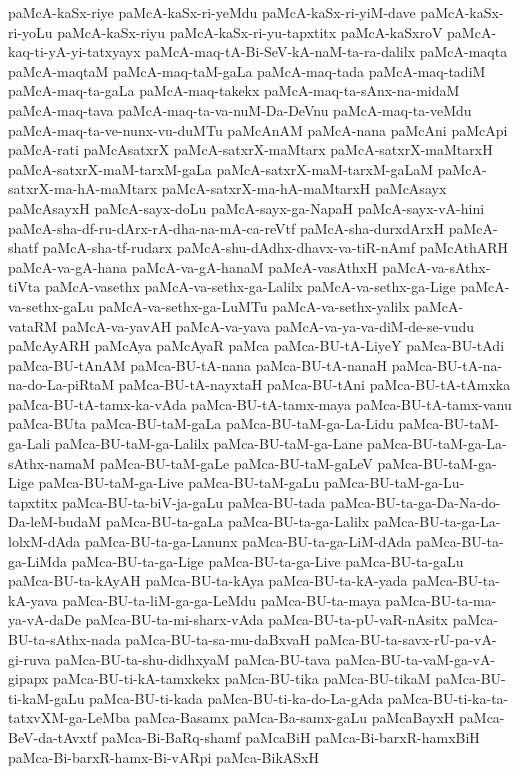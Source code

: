 {paMcA-kaSx-riye
paMcA-kaSx-ri-yeMdu
paMcA-kaSx-ri-yiM-dave
paMcA-kaSx-ri-yoLu
paMcA-kaSx-riyu
paMcA-kaSx-ri-yu-tapxtitx
paMcA-kaSxroV
paMcA-kaq-ti-yA-yi-tatxyayx
paMcA-maq-tA-Bi-SeV-kA-naM-ta-ra-dalilx
paMcA-maqta
paMcA-maqtaM
paMcA-maq-taM-gaLa
paMcA-maq-tada
paMcA-maq-tadiM
paMcA-maq-ta-gaLa
paMcA-maq-takekx
paMcA-maq-ta-sAnx-na-midaM
paMcA-maq-tava
paMcA-maq-ta-va-nuM-Da-DeVnu
paMcA-maq-ta-veMdu
paMcA-maq-ta-ve-nunx-vu-duMTu
paMcAnAM
paMcA-nana
paMcAni
paMcApi
paMcA-rati
paMcAsatxrX
paMcA-satxrX-maMtarx
paMcA-satxrX-maMtarxH
paMcA-satxrX-maM-tarxM-gaLa
paMcA-satxrX-maM-tarxM-gaLaM
paMcA-satxrX-ma-hA-maMtarx
paMcA-satxrX-ma-hA-maMtarxH
paMcAsayx
paMcAsayxH
paMcA-sayx-doLu
paMcA-sayx-ga-NapaH
paMcA-sayx-vA-hini
paMcA-sha-df-ru-dArx-rA-dha-na-mA-ca-reVtf
paMcA-sha-durxdArxH
paMcA-shatf
paMcA-sha-tf-rudarx
paMcA-shu-dAdhx-dhavx-va-tiR-nAmf
paMcAthARH
paMcA-va-gA-hana
paMcA-va-gA-hanaM
paMcA-vasAthxH
paMcA-va-sAthx-tiVta
paMcA-vasethx
paMcA-va-sethx-ga-Lalilx
paMcA-va-sethx-ga-Lige
paMcA-va-sethx-gaLu
paMcA-va-sethx-ga-LuMTu
paMcA-va-sethx-yalilx
paMcA-vataRM
paMcA-va-yavAH
paMcA-va-yava
paMcA-va-ya-va-diM-de-se-vudu
paMcAyARH
paMcAya
paMcAyaR
paMca
paMca-BU-tA-LiyeY
paMca-BU-tAdi
paMca-BU-tAnAM
paMca-BU-tA-nana
paMca-BU-tA-nanaH
paMca-BU-tA-na-na-do-La-piRtaM
paMca-BU-tA-nayxtaH
paMca-BU-tAni
paMca-BU-tA-tAmxka
paMca-BU-tA-tamx-ka-vAda
paMca-BU-tA-tamx-maya
paMca-BU-tA-tamx-vanu
paMca-BUta
paMca-BU-taM-gaLa
paMca-BU-taM-ga-La-Lidu
paMca-BU-taM-ga-Lali
paMca-BU-taM-ga-Lalilx
paMca-BU-taM-ga-Lane
paMca-BU-taM-ga-La-sAthx-namaM
paMca-BU-taM-gaLe
paMca-BU-taM-gaLeV
paMca-BU-taM-ga-Lige
paMca-BU-taM-ga-Live
paMca-BU-taM-gaLu
paMca-BU-taM-ga-Lu-tapxtitx
paMca-BU-ta-biV-ja-gaLu
paMca-BU-tada
paMca-BU-ta-ga-Da-Na-do-Da-leM-budaM
paMca-BU-ta-gaLa
paMca-BU-ta-ga-Lalilx
paMca-BU-ta-ga-La-lolxM-dAda
paMca-BU-ta-ga-Lanunx
paMca-BU-ta-ga-LiM-dAda
paMca-BU-ta-ga-LiMda
paMca-BU-ta-ga-Lige
paMca-BU-ta-ga-Live
paMca-BU-ta-gaLu
paMca-BU-ta-kAyAH
paMca-BU-ta-kAya
paMca-BU-ta-kA-yada
paMca-BU-ta-kA-yava
paMca-BU-ta-liM-ga-ga-LeMdu
paMca-BU-ta-maya
paMca-BU-ta-ma-ya-vA-daDe
paMca-BU-ta-mi-sharx-vAda
paMca-BU-ta-pU-vaR-nAsitx
paMca-BU-ta-sAthx-nada
paMca-BU-ta-sa-mu-daBxvaH
paMca-BU-ta-savx-rU-pa-vA-gi-ruva
paMca-BU-ta-shu-didhxyaM
paMca-BU-tava
paMca-BU-ta-vaM-ga-vA-gipapx
paMca-BU-ti-kA-tamxkekx
paMca-BU-tika
paMca-BU-tikaM
paMca-BU-ti-kaM-gaLu
paMca-BU-ti-kada
paMca-BU-ti-ka-do-La-gAda
paMca-BU-ti-ka-ta-tatxvXM-ga-LeMba
paMca-Basamx
paMca-Ba-samx-gaLu
paMcaBayxH
paMca-BeV-da-tAvxtf
paMca-Bi-BaRq-shamf
paMcaBiH
paMca-Bi-barxR-hamxBiH
paMca-Bi-barxR-hamx-Bi-vARpi
paMca-BikASxH
}
